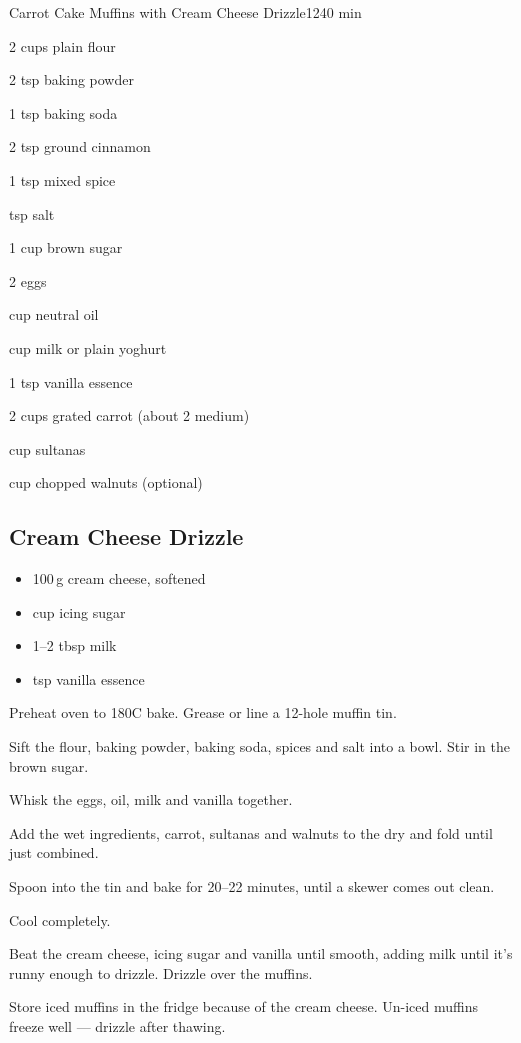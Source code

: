 \begin{recipebox}{Carrot Cake Muffins with Cream Cheese Drizzle}{12}{40 min}
\begin{ingredients}
  \item 2 cups plain flour
  \item 2 tsp baking powder
  \item 1 tsp baking soda
  \item 2 tsp ground cinnamon
  \item 1 tsp mixed spice
  \item {} tsp salt
  \item 1 cup brown sugar
  \item 2 eggs
  \item {} cup neutral oil
  \item {} cup milk or plain yoghurt
  \item 1 tsp vanilla essence
  \item 2 cups grated carrot (about 2 medium)
  \item {} cup sultanas
  \item {} cup chopped walnuts (optional)
\end{ingredients}

\subsection*{Cream Cheese Drizzle}
\begin{itemize}[leftmargin=2em]
  \item 100\,g cream cheese, softened
  \item {} cup icing sugar
  \item 1--2 tbsp milk
  \item {} tsp vanilla essence
\end{itemize}

\begin{method}
  \item Preheat oven to 180\degree C bake. Grease or line a 12-hole muffin tin.
  \item Sift the flour, baking powder, baking soda, spices and salt into a bowl. Stir in the brown sugar.
  \item Whisk the eggs, oil, milk and vanilla together.
  \item Add the wet ingredients, carrot, sultanas and walnuts to the dry and fold until just combined.
  \item Spoon into the tin and bake for 20--22 minutes, until a skewer comes out clean.
  \item Cool completely.
  \item Beat the cream cheese, icing sugar and vanilla until smooth, adding milk until it's runny enough to drizzle. Drizzle over the muffins.
\end{method}

\begin{notes}
Store iced muffins in the fridge because of the cream cheese. Un-iced muffins freeze well --- drizzle after thawing.
\end{notes}
\end{recipebox}
